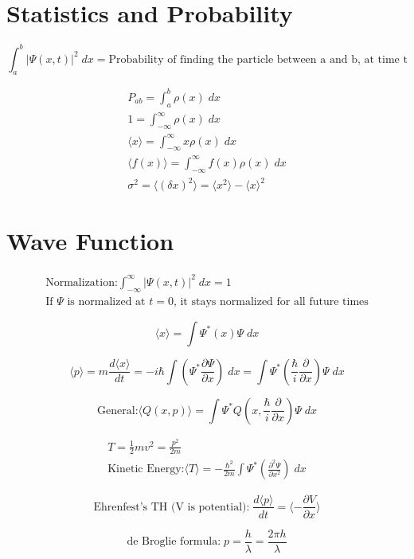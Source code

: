\documentclass[10pt,twocolumn,a4paper]{article}
\begin{document}
\section*{Statistics and Probability}
\begin{equation*}
\int_{a}^{b} |\Psi(x,t)|^2 \; dx = \text{Probability of finding the particle between a and b, at time t}
\end{equation*}

\begin{align}
P_{ab} = \int_{a}^{b}\rho(x) \; dx\\
1 = \int_{-\infty}^{\infty}\rho(x) \; dx\\
\langle x \rangle = \int_{-\infty}^{\infty} x\rho(x) \; dx\\
\langle f(x) \rangle = \int_{-\infty}^{\infty} f(x)\rho(x) \; dx\\
\sigma^2 = \langle (\delta x)^2 \rangle = \langle x^2 \rangle - \langle x \rangle^2
\end{align}

\section*{Wave Function}
\begin{align*}
\text{Normalization:}\int_{- \infty}^{\infty} |\Psi(x,t)|^2 \; dx = 1 \\
\text{If $\Psi$ is normalized at $t=0$, it stays normalized for all future times}
\end{align*}

\begin{equation*}
\langle x \rangle = \int \Psi^{\ast}\left(x\right)\Psi \; dx
\end{equation*}

\begin{equation*}
\langle p \rangle = m \frac{d \langle x \rangle}{dt} = -i \hbar \int \left( \Psi^{\ast} \frac{\partial \Psi}{\partial x} \right) \; dx = \int \Psi^{\ast} \left(\frac{\hbar}{i} \frac{\partial}{\partial x} \right) \Psi \; dx 
\end{equation*}

\begin{equation*}
\text{General:} \langle Q(x,p) \rangle = \int \Psi^{\ast} Q \left( x, \frac{\hbar}{i}\frac{\partial}{\partial x}\right) \Psi \; dx
\end{equation*}

\begin{align*}
T = \frac{1}{2}mv^2 = \frac{p^2}{2m}\\
\text{Kinetic Energy:} \langle T \rangle = -\frac{\hbar^2}{2m} \int \Psi^{\ast} \left( \frac{\partial^2 \Psi}{\partial x^2} \right) \; dx
\end{align*}

\begin{equation*}
\text{Ehrenfest's TH (V is potential):} \; \frac{d \langle p \rangle}{dt} = \langle -\frac{\partial V}{\partial x} \rangle
\end{equation*}	

\begin{equation*}
\text{de Broglie formula:} \; p = \frac{h}{\lambda} = \frac{2\pi h}{\lambda}
\end{equation*}
\end{document}
